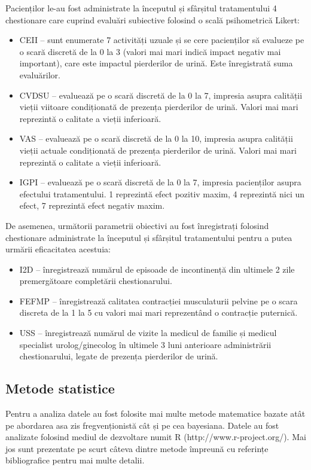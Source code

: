 \documentclass[12pt]{article}
\begin{document}
  Pacienților le-au fost administrate la începutul și sfârșitul tratamentului 4 chestionare care cuprind evaluări subiective folosind o scală psihometrică Likert:
  \begin{itemize}
    \item \ac{CEII} -- sunt enumerate 7 activități uzuale și se cere pacienților să evalueze pe o scară discretă de la 0 la 3 (valori mai mari indică impact negativ mai important), care este impactul pierderilor de urină. Este înregistrată suma evaluărilor.
    \item \ac{CVDSU} -- evaluează pe o scară discretă de la 0 la 7, impresia asupra calității vieții viitoare condiționată de prezența pierderilor de urină. Valori mai mari reprezintă o calitate a vieții inferioară.
    \item \ac{VAS} -- evaluează pe o scară discretă de la 0 la 10, impresia asupra calității vieții actuale condiționată de prezența pierderilor de urină. Valori mai mari reprezintă o calitate a vieții inferioară.
    \item \ac{IGPI} -- evaluează pe o scară discretă de la 0 la 7, impresia pacienților asupra efectului tratamentului. 1 reprezintă efect pozitiv maxim, 4 reprezintă nici un efect, 7 reprezintă efect negativ maxim.
  \end{itemize}
  De asemenea, următorii parametrii obiectivi au fost înregistrați folosind chestionare administrate la începutul și sfârșitul tratamentului pentru a putea urmării eficacitatea acestuia:
  \begin{itemize}
    \item I2D -- înregistrează numărul de episoade de incontinență din ultimele 2 zile premergătoare completării chestionarului. 
    \item \ac{FEFMP} -- înregistrează calitatea contracției musculaturii pelvine pe o scara discreta de la 1 la 5 cu valori mai mari reprezentând o contracție puternică. 
    \item \ac{USS} -- înregistrează numărul de vizite la medicul de familie și medicul specialist urolog/ginecolog în ultimele 3 luni anterioare administrării chestionarului, legate de prezența pierderilor de urină.
  \end{itemize}

\subsection{Metode statistice}
  Pentru a analiza datele au fost folosite mai multe metode matematice bazate atât pe abordarea asa zis fregvenționistă cât și pe cea bayesiana. Datele au fost analizate folosind mediul de dezvoltare numit R (http://www.r-project.org/). Mai jos sunt prezentate pe scurt câteva dintre metode împreună cu referințe bibliografice pentru mai multe detalii.
\end{document}
